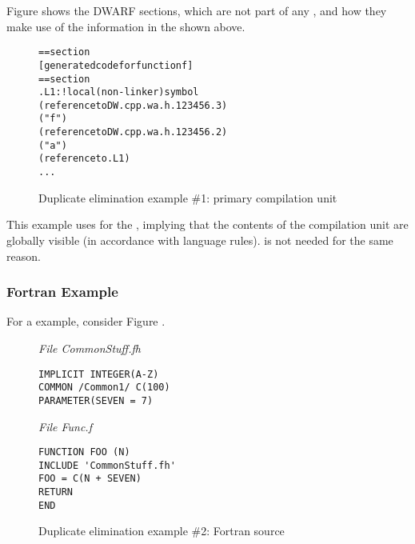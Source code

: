 Figure 
shows the  DWARF sections, which are not part of
any , 
and how they make use of the information
in the  shown above.

\begin{figure}
\begin{dwflisting}
\begin{alltt}
== section \dottext{}
    [generated code for function f]
== section \dotdebuginfo{}
    \DWTAGcompileunit
.L1:                           ! local (non-linker) symbol
        \DWTAGreferencetype
            \DWATtype(reference to DW.cpp.wa.h.123456.3)
        \DWTAGsubprogram
            \DWATname("f")
            \DWATtype(reference to DW.cpp.wa.h.123456.2)
            \DWTAGvariable
                \DWATname("a")
                \DWATtype(reference to .L1)
        ...
\end{alltt}
\end{dwflisting}
\caption{Duplicate elimination example \#1: primary compilation unit} 
\label{fig:duplicateeliminationexample1primarycompilationunit}
\end{figure}

This example uses \DWTAGcompileunit{} 
for the ,
implying that the contents of the compilation unit are
globally visible (in accordance with 
 language rules).
\DWTAGpartialunit{} 
is not needed for the same reason.

\subsubsection{Fortran Example}


For a 
example, consider 
Figure .

\begin{figure}
\textit{File CommonStuff.f\hspace{1pt}h}
\begin{lstlisting}[numbers=none]
IMPLICIT INTEGER(A-Z)
COMMON /Common1/ C(100)
PARAMETER(SEVEN = 7)
\end{lstlisting}

\textit{File Func.f}
\begin{lstlisting}[numbers=none]
FUNCTION FOO (N)
INCLUDE 'CommonStuff.fh'
FOO = C(N + SEVEN)
RETURN
END
\end{lstlisting}
\caption{Duplicate elimination example \#2: Fortran source} 
\label{fig:duplicateeliminationexample2fortransource}
\end{figure}



